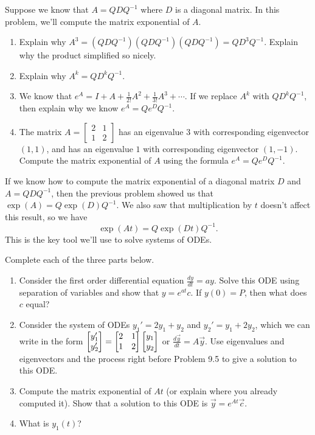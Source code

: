 \begin{problem}
 Suppose we know that $A = QDQ^{-1}$ where $D$ is a diagonal matrix.  In this problem,  we'll compute the matrix exponential of $A$.
\begin{enumerate}
 \item Explain why $A^3 = (QDQ^{-1})(QDQ^{-1})(QDQ^{-1}) = QD^3Q^{-1}$. Explain why the product simplified so nicely.
 \item Explain why $A^k = QD^kQ^{-1}$.
 \item We know that $e^A = I+A+\frac{1}{2!}A^2+\frac{1}{3!}A^3+\cdots$. If we replace $A^k$ with $QD^kQ^{-1}$, then explain why we know $e^{A} = Qe^{D} Q^{-1}$.
 \item 
{}%
The matrix $A = \begin{bmatrix}2&1\\1&2\end{bmatrix}$ has an eigenvalue $3$ with corresponding eigenvector $(1,1)$, and has an eigenvalue $1$ with corresponding eigenvector $(1,-1)$.  Compute the matrix exponential of $A$ using the formula $e^A = Qe^DQ^{-1}$. 
\end{enumerate}
\end{problem}

If we know how to compute the matrix exponential of a diagonal matrix $D$ and $A=QDQ^{-1}$, then the previous problem showed us that 
$\exp (A) = Q \exp(D) Q^{-1}.$ 
We also saw that multiplication by $t$ doesn't affect this result, so we have 
$$\exp (At) = Q \exp(Dt) Q^{-1}.$$ 
This is the key tool we'll use to solve systems of ODEs. 

\begin{problem}
Complete each of the three parts below.
\begin{enumerate}
 \item 
 Consider the first order differential equation $\frac{dy}{dt} = ay$. Solve this ODE using separation of variables and show that $y = e^{at}c$.  If $y(0) = P$, then what does $c$ equal?
 \item 
 Consider the system of ODEs $y_1' = 2y_1+y_2$ and $y_2' = y_1+2y_2$, which we can write in the form 
$\begin{bmatrix} y_1'\\y_2' \end{bmatrix} = \begin{bmatrix} 2&1\\1&2 \end{bmatrix} \begin{bmatrix} y_1\\y_2 \end{bmatrix}$ or $\frac{d\vec y}{dt} = A\vec y$. Use eigenvalues and eigenvectors and the process right before Problem 9.5 to give a solution to this ODE. 
 \item 
{}%
Compute the matrix exponential of $At$ (or explain where you already computed it). Show that a solution to this ODE is $\vec y = e^{At}\vec c$.
 \item What is $y_1(t)$?
\end{enumerate}
\end{problem}



